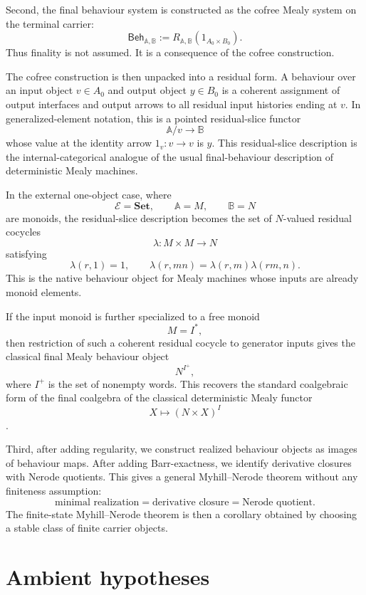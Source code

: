 Second, the final behaviour system is constructed as the cofree Mealy system
on the terminal carrier:
\[
\mathsf{Beh}_{\mathbb A,\mathbb B}
:=
R_{\mathbb A,\mathbb B}(1_{A_0\times B_0}).
\]
Thus finality is not assumed. It is a consequence of the cofree construction.

The cofree construction is then unpacked into a residual form. A behaviour
over an input object \(v\in A_0\) and output object \(y\in B_0\) is a coherent
assignment of output interfaces and output arrows to all residual input
histories ending at \(v\). In generalized-element notation, this is a pointed
residual-slice functor
\[
\mathbb A/v\longrightarrow\mathbb B
\]
whose value at the identity arrow \(1_v:v\to v\) is \(y\). This residual-slice
description is the internal-categorical analogue of the usual final-behaviour
description of deterministic Mealy machines.

In the external one-object case, where
\[
\mathcal E=\mathbf{Set},
\qquad
\mathbb A=M,
\qquad
\mathbb B=N
\]
are monoids, the residual-slice description becomes the set of
\(N\)-valued residual cocycles
\[
\lambda:M\times M\to N
\]
satisfying
\[
\lambda(r,1)=1,
\qquad
\lambda(r,mn)=\lambda(r,m)\lambda(rm,n).
\]
This is the native behaviour object for Mealy machines whose inputs are
already monoid elements.

If the input monoid is further specialized to a free monoid
\[
M=I^\ast,
\]
then restriction of such a coherent residual cocycle to generator inputs gives
the classical final Mealy behaviour object
\[
N^{I^+},
\]
where \(I^+\) is the set of nonempty words. This recovers the standard
coalgebraic form of the final coalgebra of the classical deterministic Mealy
functor
\[
X\mapsto (N\times X)^I
\]
\cite{RuttenUniversalCoalgebra,SilvaCoalgebraicAutomata,PattinsonCoalgebraNotes}.

Third, after adding regularity, we construct realized behaviour objects as
images of behaviour maps. After adding Barr-exactness, we identify derivative
closures with Nerode quotients. This gives a general Myhill--Nerode theorem
without any finiteness assumption:
\[
\text{minimal realization}
=
\text{derivative closure}
=
\text{Nerode quotient}.
\]
The finite-state Myhill--Nerode theorem is then a corollary obtained by
choosing a stable class of finite carrier objects.

\section{Ambient hypotheses}
\label{sec:mealy-comonad-ambient-hypotheses}

